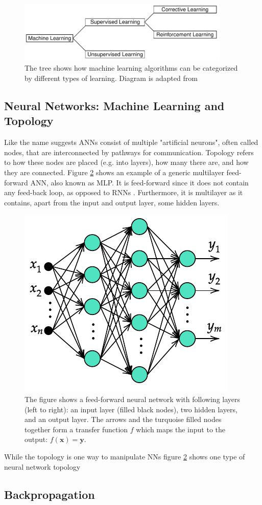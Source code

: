 \begin{figure}
    \centering
    \includegraphics[width=0.9\textwidth]{img/types-of-learning-diagram.pdf}
    \caption{The tree shows how machine learning algorithms can be categorized by different types of learning. Diagram is adapted from \cite[fig. 4.3]{Rojas1996a}}
    \label{fig:types-of-learning}
\end{figure}



\subsection{Neural Networks: Machine Learning and Topology}
Like the name suggests \acp{ANN} consist of multiple "artificial neurons", often called nodes, that are interconnected by pathways for communication.
Topology refers to how these nodes are placed (e.g. into layers), how many there are, and how they are connected.
Figure \ref{fig:generic-ann} shows an example of a generic multilayer feed-forward \ac{ANN}, also known as \ac{MLP}.
It is feed-forward since it does not contain any feed-back loop, as opposed to \acp{RNN} \cite{Goodfellow2016, Haykin2009}. Furthermore, it is multilayer as it contains, apart from the input and output layer, some hidden layers.

\begin{figure}
    \centering
    \includegraphics{img/generic-ann-diagram}
    \caption{The figure shows a feed-forward neural network with following layers (left to right): an input layer (filled black nodes), two hidden layers, and an output layer. The arrows and the turquoise filled nodes together form a transfer function $f$ which maps the input to the output: $f(\mathbf{x})=\mathbf{y} $.}
    \label{fig:generic-ann}
\end{figure}

While the topology is one way to manipulate \acp{NN} figure \ref{fig:generic-ann} shows one type of neural network topology

\subsection{Backpropagation}

